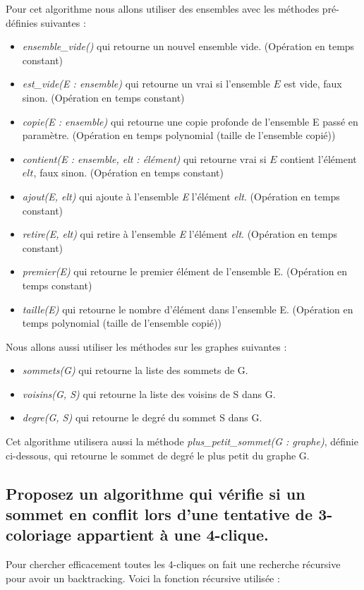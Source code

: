 \documentclass[a4paper, 11pt]{article}
\begin{document}
    Pour cet algorithme nous allons utiliser des ensembles avec les méthodes pré-définies suivantes :
    \begin{itemize}
        \item \emph{ensemble\_vide()} qui retourne un nouvel ensemble vide. (Opération en temps constant)
        \item \emph{est\_vide(E : ensemble)} qui retourne un vrai si l'ensemble $E$ est vide, faux sinon. (Opération en temps constant)
        \item \emph{copie(E : ensemble)} qui retourne une copie profonde de l'ensemble E passé en paramètre. (Opération en temps polynomial (taille de l'ensemble copié))
        \item \emph{contient(E : ensemble, elt : élément)} qui retourne vrai si $E$ contient l'élément $elt$, faux sinon. (Opération en temps constant)
        \item \emph{ajout(E, elt)} qui ajoute à l'ensemble \emph{E} l'élément \emph{elt}. (Opération en temps constant)
        \item \emph{retire(E, elt)} qui retire à l'ensemble \emph{E} l'élément \emph{elt}. (Opération en temps constant)
        \item \emph{premier(E)} qui retourne le premier élément de l'ensemble E. (Opération en temps constant)
        \item \emph{taille(E)} qui retourne le nombre d'élément dans l'ensemble E. (Opération en temps polynomial (taille de l'ensemble copié))
    \end{itemize}

    \bigskip
    Nous allons aussi utiliser les méthodes sur les graphes suivantes :
    \begin{itemize}
        \item \emph{sommets(G)} qui retourne la liste des sommets de G\@.
        \item \emph{voisins(G, S)} qui retourne la liste des voisins de S dans G\@.
        \item \emph{degre(G, S)} qui retourne le degré du sommet S dans G\@.
    \end{itemize}

    \bigskip
    Cet algorithme utilisera aussi la méthode \emph{plus\_petit\_sommet(G : graphe)},
    définie ci-dessous, qui retourne le sommet de degré le plus petit du graphe G\@.

    
    

    \subsection{Proposez un algorithme qui vérifie si un sommet en conflit lors d’une tentative de 3-coloriage
    appartient à une 4-clique.}\label{subsec:Q3C}
    Pour chercher efficacement toutes les 4-cliques on fait une recherche récursive pour avoir un backtracking.
    Voici la fonction récursive utilisée :
    
\end{document}

